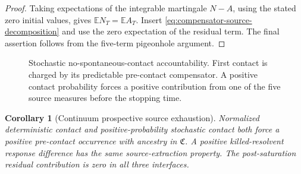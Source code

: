 \documentclass[11pt]{article}
\numberwithin{section}{part}
\theoremstyle{plain}
\newtheorem{corollary}[corollary]{Corollary}
\theoremstyle{definition}
\theoremstyle{remark}
\newcommand{\Channels}{\mathfrak C}
\begin{document}
\begin{proof}
Taking expectations of the integrable martingale \(N-A\), using the stated
zero initial values, gives
\(\mathbb E N_T=\mathbb E A_T\).  Insert
\eqref{eq:compensator-source-decomposition} and use the zero expectation of
the residual term.  The final assertion follows from the five-term
pigeonhole argument.
\end{proof}

\begin{figure}[tbp]
\centering
{}
\caption{Stochastic no-spontaneous-contact accountability.  First contact is
charged by its predictable pre-contact compensator.  A positive contact
probability forces a positive contribution from one of the five source
measures before the stopping time.}
\label{fig:stochastic-prospective}
\end{figure}

\begin{corollary}[Continuum prospective source exhaustion]
\label{cor:continuum-prospective-exhaustion}
Normalized deterministic contact and positive-probability stochastic contact
both force a positive pre-contact occurrence with ancestry in
\(\Channels\).  A positive killed-resolvent response difference has the same
source-extraction property.  The post-saturation residual contribution is
zero in all three interfaces.
\end{corollary}
\end{document}
